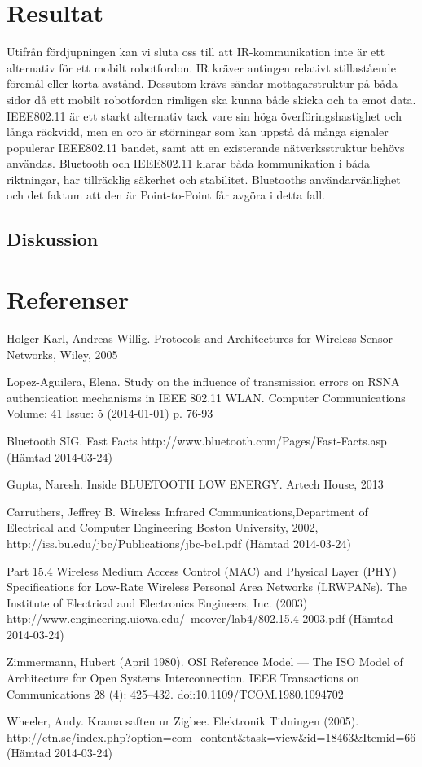 \documentclass[a4paper,12pt,fleqn]{article}
\begin{document}
\section{Resultat}
Utifrån fördjupningen kan vi sluta oss till att IR-kommunikation inte är ett alternativ för ett mobilt robotfordon. IR kräver antingen relativt stillastående föremål eller korta avstånd. Dessutom krävs sändar-mottagarstruktur på båda sidor då ett mobilt robotfordon rimligen ska kunna både skicka och ta emot data. 
IEEE802.11 är ett starkt alternativ tack vare sin höga överföringshastighet och långa räckvidd, men en oro är störningar som kan uppstå då många signaler populerar IEEE802.11 bandet, samt att en existerande nätverksstruktur behövs användas.
Bluetooth och IEEE802.11 klarar båda kommunikation i båda riktningar, har tillräcklig säkerhet och stabilitet. Bluetooths användarvänlighet och det faktum att den är Point-to-Point får avgöra i detta fall.

\subsection{Diskussion}

\newpage 
\section{Referenser}

Holger Karl, Andreas Willig. Protocols and Architectures for Wireless Sensor Networks, Wiley, 2005

Lopez-Aguilera, Elena. Study on the influence of transmission errors on RSNA authentication mechanisms in IEEE 802.11 WLAN. Computer Communications Volume: 41 Issue: 5 (2014-01-01) p. 76-93

Bluetooth SIG. Fast Facts http://www.bluetooth.com/Pages/Fast-Facts.asp (Hämtad 2014-03-24)

Gupta, Naresh. Inside BLUETOOTH LOW ENERGY. Artech House, 2013

Carruthers, Jeffrey B. Wireless Infrared Communications,Department of Electrical and Computer Engineering
Boston University, 2002, http://iss.bu.edu/jbc/Publications/jbc-bc1.pdf (Hämtad 2014-03-24)

Part 15.4 Wireless Medium Access Control (MAC) and Physical Layer (PHY) Specifications for Low-Rate Wireless Personal Area Networks (LR\text{-}WPANs). The Institute of Electrical and Electronics Engineers, Inc. (2003) \\ http://www.engineering.uiowa.edu/~mcover/lab4/802.15.4-2003.pdf (Hämtad 2014-03-24)

Zimmermann, Hubert (April 1980). OSI Reference Model — The ISO Model of Architecture for Open Systems Interconnection. IEEE Transactions on Communications 28 (4): 425–432. doi:10.1109/TCOM.1980.1094702

Wheeler, Andy. Krama saften ur Zigbee. Elektronik Tidningen (2005). \\ http://etn.se/index.php?option=com\_content\&task=view\&id=18463\&Itemid=66 (Hämtad 2014-03-24)
\end{document}
